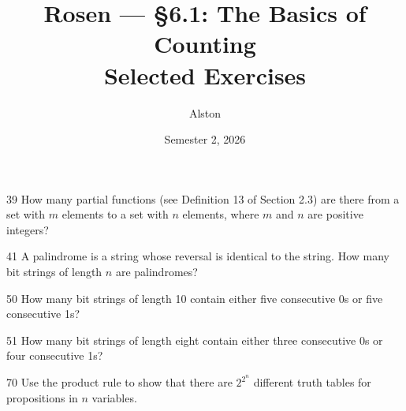 \documentclass[11pt]{article}
\title{Rosen --- \S 6.1: The Basics of Counting\\ \large Selected Exercises}
\author{Alston}
\date{Semester 2, 2026}
\begin{document}
\maketitle

\begin{exercise}{39}
    How many partial functions (see Definition 13 of Section 2.3) are
    there from a set with $m$ elements to a set with $n$ elements,
    where $m$ and $n$ are positive integers?
\end{exercise}

\begin{exercise}{41}
    A palindrome is a string whose reversal is identical to the
    string. How many bit strings of length $n$ are palindromes?
\end{exercise}

\begin{exercise}{50}
    How many bit strings of length 10 contain either five consecutive
    0s or five consecutive 1s?
\end{exercise}

\begin{exercise}{51}
    How many bit strings of length eight contain either three
    consecutive 0s or four consecutive 1s?
\end{exercise}

\begin{exercise}{70}
    Use the product rule to show that there are $2^{2^n}$ different
    truth tables for propositions in $n$ variables.
\end{exercise}
\end{document}
